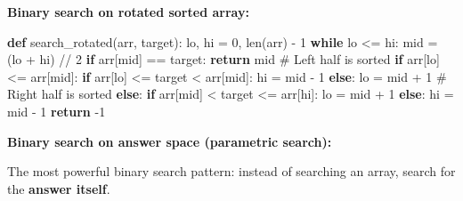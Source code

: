 \documentclass[11pt]{article}
\newenvironment{Shaded}{\begin{snugshade}}{\end{snugshade}}
\newcommand{\BuiltInTok}[1]{\textcolor[rgb]{0.50,0.55,0.55}{#1}}
\newcommand{\CommentTok}[1]{\textcolor[rgb]{0.48,0.49,0.49}{#1}}
\newcommand{\ControlFlowTok}[1]{\textcolor[rgb]{0.99,0.74,0.29}{\textbf{#1}}}
\newcommand{\DecValTok}[1]{\textcolor[rgb]{0.96,0.45,0.00}{#1}}
\newcommand{\KeywordTok}[1]{\textcolor[rgb]{0.81,0.81,0.76}{\textbf{#1}}}
\newcommand{\NormalTok}[1]{\textcolor[rgb]{0.81,0.81,0.76}{#1}}
\newcommand{\OperatorTok}[1]{\textcolor[rgb]{0.81,0.81,0.76}{#1}}
\begin{document}
\textbf{Binary search on rotated sorted array:}


\begin{Shaded}
\begin{Highlighting}[]
\KeywordTok{def}\NormalTok{ search\_rotated(arr, target):}
\NormalTok{    lo, hi }\OperatorTok{=} \DecValTok{0}\NormalTok{, }\BuiltInTok{len}\NormalTok{(arr) }\OperatorTok{{-}} \DecValTok{1}
    \ControlFlowTok{while}\NormalTok{ lo }\OperatorTok{\textless{}=}\NormalTok{ hi:}
\NormalTok{        mid }\OperatorTok{=}\NormalTok{ (lo }\OperatorTok{+}\NormalTok{ hi) }\OperatorTok{//} \DecValTok{2}
        \ControlFlowTok{if}\NormalTok{ arr[mid] }\OperatorTok{==}\NormalTok{ target:}
            \ControlFlowTok{return}\NormalTok{ mid}
        \CommentTok{\# Left half is sorted}
        \ControlFlowTok{if}\NormalTok{ arr[lo] }\OperatorTok{\textless{}=}\NormalTok{ arr[mid]:}
            \ControlFlowTok{if}\NormalTok{ arr[lo] }\OperatorTok{\textless{}=}\NormalTok{ target }\OperatorTok{\textless{}}\NormalTok{ arr[mid]:}
\NormalTok{                hi }\OperatorTok{=}\NormalTok{ mid }\OperatorTok{{-}} \DecValTok{1}
            \ControlFlowTok{else}\NormalTok{:}
\NormalTok{                lo }\OperatorTok{=}\NormalTok{ mid }\OperatorTok{+} \DecValTok{1}
        \CommentTok{\# Right half is sorted}
        \ControlFlowTok{else}\NormalTok{:}
            \ControlFlowTok{if}\NormalTok{ arr[mid] }\OperatorTok{\textless{}}\NormalTok{ target }\OperatorTok{\textless{}=}\NormalTok{ arr[hi]:}
\NormalTok{                lo }\OperatorTok{=}\NormalTok{ mid }\OperatorTok{+} \DecValTok{1}
            \ControlFlowTok{else}\NormalTok{:}
\NormalTok{                hi }\OperatorTok{=}\NormalTok{ mid }\OperatorTok{{-}} \DecValTok{1}
    \ControlFlowTok{return} \OperatorTok{{-}}\DecValTok{1}
\end{Highlighting}
\end{Shaded}

\textbf{Binary search on answer space (parametric search):}

The most powerful binary search pattern: instead of searching an array, search for the \textbf{answer itself}.

\end{document}
